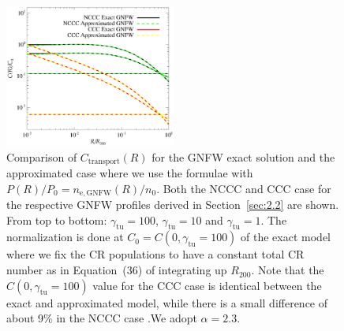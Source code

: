 \documentclass[traditabstract]{aa}
\newcommand{\rmn}{\mathrm}
\begin{document}
\begin{appendix}
\begin{figure}[t]
\centering
\includegraphics[width=0.5\textwidth]{figures/CR_profiles_REXexactVSfake.eps}
\caption{Comparison of $C_{\rmn{transport}}(R)$ for the GNFW exact solution and the approximated case where we use the \cite{2011A&A...527A..99E} formulae with $P(R)/P_{0}=n_{\rmn{e,GNFW}}(R)/n_{0}$. Both the NCCC and CCC case for the respective GNFW profiles derived in Section~\ref{sec:2.2} are shown. From top to bottom: $\gamma_{\rmn{tu}}=100$, $\gamma_{\rmn{tu}}=10$ and $\gamma_{\rmn{tu}}=1$. The normalization is done at $C_{0}=C(0,\gamma_{\rmn{tu}}=100)$ of the exact model where we fix the CR populations to have a constant total CR number as in Equation~(36) of \cite{2011A&A...527A..99E} integrating up $R_{200}$. Note that the $C(0,\gamma_{\rmn{tu}}=100)$ value for the CCC case is identical between the exact and approximated model, while there is a small difference of about 9\% in the NCCC case .We adopt $\alpha=2.3$.}
\label{fig:REXexactVSfake}
\end{figure}


\end{appendix}
\end{document}
